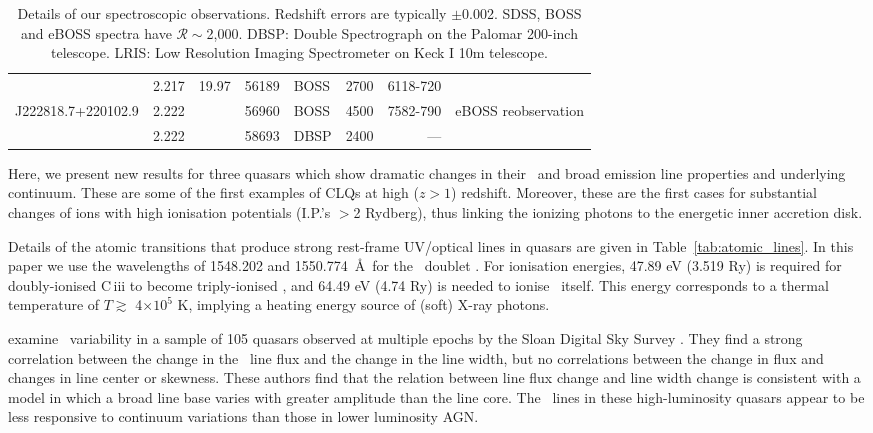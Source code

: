 \documentclass[fleqn,usenatbib]{mnras}
\begin{document}
\begin{table}
\begin{tabular}{l l   r ll  r r l}
                                      & 2.217                               & 19.97          &  56189                    &  BOSS                                    &  2700            &   6118-720          & \\
 J222818.7+220102.9   & 2.222                               &                    &  56960                     & BOSS                                    &  4500            &   7582-790          & eBOSS reobservation \\ 
                                     &  2.222                               &                    &  58693                    &  DBSP                                    & 2400             &    ---                        &    \\
    \hline \hline   
  \end{tabular}
  \caption{Details of our spectroscopic observations.  Redshift errors are
    typically $\pm$0.002.  SDSS, BOSS and eBOSS spectra have
    $\mathcal{R}\sim$2,000.  DBSP: Double Spectrograph on the Palomar
    200-inch telescope.  LRIS: Low Resolution Imaging Spectrometer on Keck
    I 10m telescope.} 
  \label{tab:obs_notes}
\end{table}

Here, we present new results for three quasars which show dramatic
changes in their \civ\ and \ciii broad emission line properties and underlying continuum. These are some of the first
examples of CLQs at high ($z>1$)
redshift. Moreover, these are the first cases for substantial changes
of ions with high ionisation potentials (I.P.'s $>$2 Rydberg), thus
linking the ionizing photons to the energetic inner accretion disk.

Details of the atomic transitions that produce strong rest-frame
UV/optical lines in quasars are given in
Table~\ref{tab:atomic_lines}. In this paper we use the wavelengths of
1548.202 and 1550.774~\AA\ for the \civ\ doublet
\citep{Kramida2018}. For ionisation energies, 47.89 eV (3.519 Ry) is
required for doubly-ionised C\,{\sc iii} to become triply-ionised \civ, and
64.49 eV (4.74 Ry) is needed to ionise \civ\ itself. This
energy corresponds to a thermal temperature of $T \gtrsim$
4$\times10^{5}$ K, implying a heating energy source of (soft) X-ray
photons. 

\citet{Wilhite2006} examine \civ\ variability in a sample
of 105 quasars observed at multiple epochs by the Sloan Digital Sky
Survey \citep[SDSS;][]{York2000, Stoughton2002, Abazajian2009}.  They
find a strong correlation between the change in the \civ\ line
flux and the change in the line width, but no correlations between the
change in flux and changes in line center or skewness.  These authors
find that the relation between line flux change and line width change
is consistent with a model in which a broad line base varies with
greater amplitude than the line core. The \civ\ lines in these
high-luminosity quasars appear to be less responsive to continuum
variations than those in lower luminosity AGN.
\end{document}
